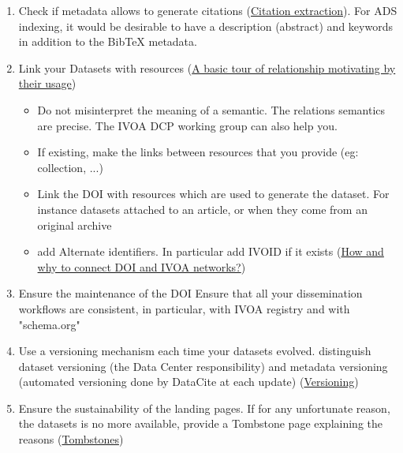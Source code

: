 \documentclass[11pt,a4paper]{ivoa}
\begin{document}
\begin{enumerate}
\begin{itemize}
\item{} Check if DOI metadata are displayed in the landing page
\item{} Complete the landing page with added information such as links to datasets and any other metadata used in other dissemination workflows
\item{} Check if the landing-page is machine-readable
\end{itemize}
\item{} Check if metadata allows to generate citations (\hyperlink{citation-extraction}{Citation extraction}).\newline
For ADS indexing, it would be desirable to have a description (abstract) and keywords in addition to the BibTeX metadata.
\item{} Link your Datasets with resources (\hyperlink{a-basic-tour-of-relationship-motivating-by-their-usage}{A basic tour of relationship motivating by their usage})


\begin{itemize}
\item{} Do not misinterpret the meaning of a semantic. The relations semantics are precise. The IVOA DCP working group can also help you.
\item{} If existing, make the links between resources that you provide (eg: collection, ...)
\item{} Link the DOI with resources which are used to generate the dataset. For instance datasets attached to an article, or when they come from an original archive
\item{} add Alternate identifiers. In particular add IVOID if it exists (\hyperlink{how-and-why-to-connect-doi-and-ivoa-networks?}{How and why to connect DOI and IVOA networks?})
\end{itemize}
\item{} Ensure the maintenance of the DOI\newline
Ensure that all your dissemination workflows are consistent, in particular, with IVOA registry and with "schema.org"
\item{} Use a versioning mechanism each time your datasets evolved. distinguish dataset versioning (the Data Center responsibility) and metadata versioning (automated versioning done by DataCite at each update) (\hyperlink{versioning}{Versioning})
\item{} Ensure the sustainability of the landing pages.\newline
If for any unfortunate reason, the datasets is no more available, provide a Tombstone page explaining the reasons (\hyperlink{tombstones}{Tombstones})
\end{enumerate}
\end{document}
